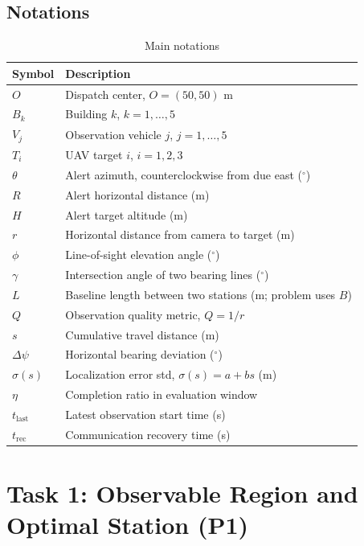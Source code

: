\documentclass{swmcmthesis}
\begin{document}
\subsection{Notations}
\begin{table}[!h]
\centering
\caption{Main notations}
\begin{tabular}{ll}
\toprule[1.5pt]
Symbol & Description\\
\midrule[1pt]
$O$ & Dispatch center, $O=(50,50)$ m\\
$B_k$ & Building $k$, $k=1,\dots,5$\\
$V_j$ & Observation vehicle $j$, $j=1,\dots,5$\\
$T_i$ & UAV target $i$, $i=1,2,3$\\
$\theta$ & Alert azimuth, counterclockwise from due east ($^\circ$)\\
$R$ & Alert horizontal distance (m)\\
$H$ & Alert target altitude (m)\\
$r$ & Horizontal distance from camera to target (m)\\
$\phi$ & Line-of-sight elevation angle ($^\circ$)\\
$\gamma$ & Intersection angle of two bearing lines ($^\circ$)\\
$L$ & Baseline length between two stations (m; problem uses $B$)\\
$Q$ & Observation quality metric, $Q=1/r$\\
$s$ & Cumulative travel distance (m)\\
$\Delta\psi$ & Horizontal bearing deviation ($^\circ$)\\
$\sigma(s)$ & Localization error std, $\sigma(s)=a+bs$ (m)\\
$\eta$ & Completion ratio in evaluation window\\
$t_{\mathrm{last}}$ & Latest observation start time (s)\\
$t_{\mathrm{rec}}$ & Communication recovery time (s)\\
\bottomrule[1.5pt]
\end{tabular}
\end{table}

\section{Task 1: Observable Region and Optimal Station (P1)}
\end{document}
